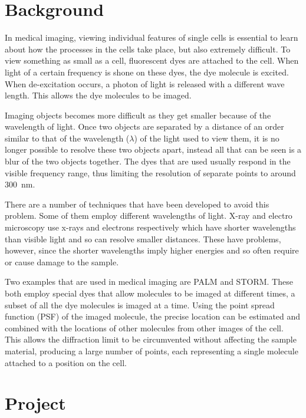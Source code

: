\section{Background}
\label{sec:background}

In medical imaging, viewing individual features of single cells is essential to
learn about how the processes in the cells take place, but also extremely
difficult. To view something as small as a cell, fluorescent dyes are attached
to the cell. When light of a certain frequency is shone on these dyes, the dye
molecule is excited. When de-excitation occurs, a photon of light is released
with a different wave length. This allows the dye molecules to be imaged.

Imaging objects becomes more difficult as they get smaller because of the
wavelength of light. Once two objects are separated by a distance of an order
similar to that of the wavelength ($\lambda$) of the light used to view them,
it is no longer possible to resolve these two objects apart, instead all that
can be seen is a blur of the two objects together. The dyes that are used
usually respond in the visible frequency range, thus limiting the resolution of
separate points to around \SI{300}{\nano\metre}.

There are a number of techniques that have been developed to avoid this
problem. Some of them employ different wavelengths of light. X-ray and electro
microscopy use x-rays and electrons respectively which have shorter wavelengths
than visible light and so can resolve smaller distances. These have problems,
however, since the shorter wavelengths imply higher energies and so often
require or cause damage to the sample.

Two examples that are used in medical imaging are PALM\cite{owen2010palm} and
STORM\cite{rust2006sub}. These both employ special dyes that allow molecules to
be imaged at different times, a subset of all the dye molecules is imaged at a
time. Using the point spread function (PSF) of the imaged molecule, the precise
location can be estimated and combined with the locations of other molecules
from other images of the cell. This allows the diffraction limit to be
circumvented without affecting the sample material, producing a large number
of points, each representing a single molecule attached to a position on the
cell.

\section{Project}
\label{sec:project}

